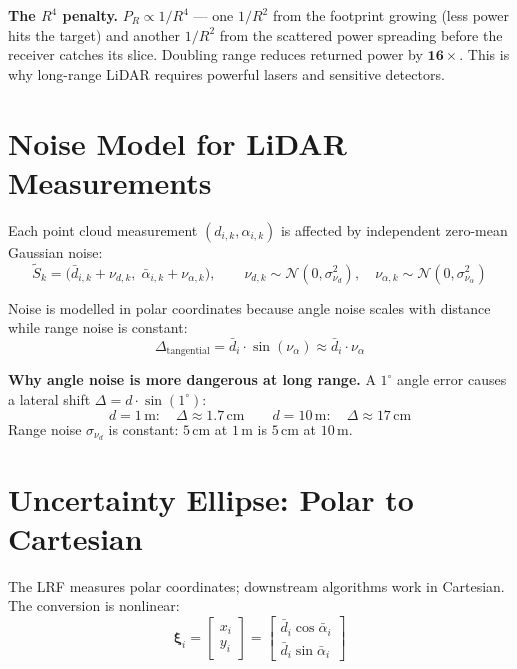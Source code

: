 \documentclass[12pt, a4paper]{article}
\begin{document}
\begin{warnbox}
  \textbf{The $R^4$ penalty.} $P_R \propto 1/R^4$ --- one $1/R^2$ from the
  footprint growing (less power hits the target) and another $1/R^2$ from the
  scattered power spreading before the receiver catches its slice.
  Doubling range reduces returned power by $\mathbf{16\times}$.
  This is why long-range LiDAR requires powerful lasers and sensitive detectors.
\end{warnbox}

\section*{Noise Model for LiDAR Measurements}

Each point cloud measurement $(d_{i,k},\alpha_{i,k})$ is affected by independent
zero-mean Gaussian noise:
\[
  \tilde{S}_k = \bigl(\bar{d}_{i,k} + \nu_{d,k},\;\bar{\alpha}_{i,k} + \nu_{\alpha,k}\bigr),
  \qquad
  \nu_{d,k} \sim \mathcal{N}(0,\sigma_{\nu_d}^2),\quad
  \nu_{\alpha,k} \sim \mathcal{N}(0,\sigma_{\nu_\alpha}^2)
\]

Noise is modelled in polar coordinates because angle noise scales with distance
while range noise is constant:
\[
  \Delta_{\text{tangential}} = \bar{d}_i \cdot \sin(\nu_\alpha) \approx \bar{d}_i \cdot \nu_\alpha
\]

\begin{notebox}
  \textbf{Why angle noise is more dangerous at long range.}
  A $1^\circ$ angle error causes a lateral shift $\Delta = d\cdot\sin(1^\circ)$:
  \[
    d = 1\,\text{m}:  \quad \Delta \approx 1.7\,\text{cm}
    \qquad
    d = 10\,\text{m}: \quad \Delta \approx 17\,\text{cm}
  \]
  Range noise $\sigma_{\nu_d}$ is constant: $5$\,cm at $1$\,m is $5$\,cm at $10$\,m.
\end{notebox}

\section*{Uncertainty Ellipse: Polar to Cartesian}

The LRF measures polar coordinates; downstream algorithms work in Cartesian.
The conversion is nonlinear:
\[
  \boldsymbol{\xi}_i =
  \begin{bmatrix} x_i \\ y_i \end{bmatrix}
  =
  \begin{bmatrix} \bar{d}_i\cos\bar{\alpha}_i \\ \bar{d}_i\sin\bar{\alpha}_i \end{bmatrix}
\]
\end{document}

